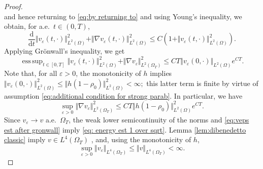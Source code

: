 \documentclass[11pt,a4paper,reqno]{amsart}
\theoremstyle{remark}
\theoremstyle{definition}
\numberwithin{equation}{section}
\DeclareMathOperator{\esssup}{ess \, sup}
\newcommand{\der}{\mathrm{d}}
\begin{document}
\begin{proof}
\begin{equation*}
\end{equation*}
and hence returning to \eqref{eq:by returning to} and using Young's inequality, we obtain, for a.e.~$t \in (0,T)$, 
\begin{equation*}
    \frac{\der}{\der t}\Vert v_\varepsilon(t,\cdot) \Vert^2_{L^2(\Omega)} + \Vert \nabla v_\varepsilon(t,\cdot) \Vert^2_{L^2(\Omega)} \leq   C (1 + \Vert v_\varepsilon(t,\cdot) \Vert^2_{L^2(\Omega)}). 
\end{equation*}
Applying Gr\"onwall's inequality, we get 
\begin{equation}\label{eq:veps est after gronwall}
    \esssup_{t \in [0,T]}\Vert v_\varepsilon(t,\cdot) \Vert^2_{L^2(\Omega)} + \Vert \nabla v_\varepsilon \Vert^2_{L^2(\Omega_T)} \leq  CT \Vert v_\varepsilon(0,\cdot) \Vert_{L^2(\Omega)} e^{ CT}. 
\end{equation}
Note that, for all $\varepsilon>0$, the monotonicity of $h$ implies 
$\Vert v_{\varepsilon}(0,\cdot) \Vert_{L^2(\Omega)}^2 \leq \Vert h(1\!-\!\rho_0) \Vert_{L^2(\Omega)}^2 < \infty;$
this latter term is finite by virtue of assumption \eqref{eq:additional condition for strong parab}. In particular, we have 
\begin{equation}\label{eq: bound sup nabla weps}
    \sup_{\varepsilon>0}\Vert \nabla v_\varepsilon \Vert^2_{L^2(\Omega_T)} \leq  CT \Vert h(1\!-\!\rho_0) \Vert_{L^2(\Omega)}^2 e^{C T}. 
\end{equation}
Since $v_\varepsilon \to v$ a.e.~$\Omega_T$, the weak lower semicontinuity of the norms and \eqref{eq:veps est after gronwall} imply \eqref{eq: energy est 1 over sqrt}. Lemma \ref{lem:dibenedetto classic} imply $v \in L^4(\Omega_T)$ , and, using the monotonicity of $h$, 
\begin{equation}\label{eq: L4 bound for weps}
   \sup_{\varepsilon>0}\Vert v_\varepsilon \Vert_{L^4(\Omega_T)} \leq \Vert v \Vert_{L^4(\Omega_T)} < \infty. 
\end{equation}

\smallskip 


\end{proof}
\end{document}

